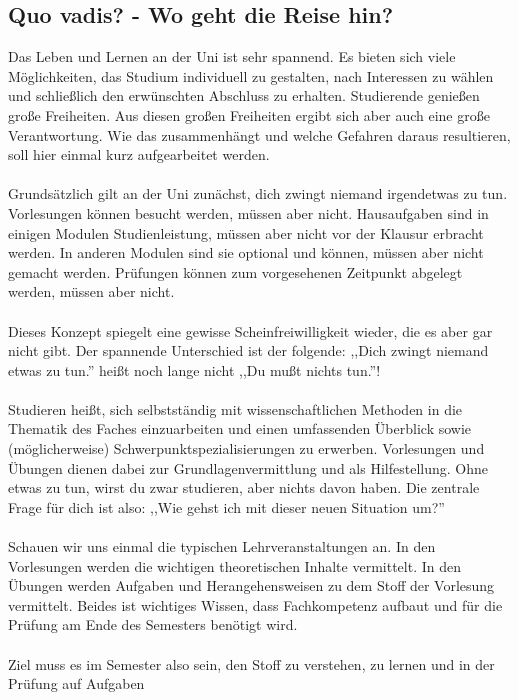 \subsection{Quo vadis? - Wo geht die Reise hin?}
        Das Leben und Lernen an der Uni ist sehr spannend. Es bieten
	sich viele Möglichkeiten, das Studium individuell zu gestalten,
	nach Interessen zu wählen und schließlich den erwünschten
	Abschluss zu erhalten. Studierende genießen große Freiheiten. Aus diesen großen Freiheiten ergibt sich aber auch
	eine große Verantwortung. Wie das zusammenhängt und welche
	Gefahren daraus resultieren, soll hier einmal kurz aufgearbeitet
	werden. \\ \\
        Grundsätzlich gilt an der Uni zunächst, dich zwingt niemand irgendetwas zu tun. Vorlesungen können besucht werden, müssen aber nicht.
Hausaufgaben sind in einigen Modulen Studienleistung, müssen aber nicht vor der Klausur erbracht werden. In anderen Modulen sind sie optional und können, müssen aber nicht gemacht werden. 
Prüfungen können zum vorgesehenen Zeitpunkt abgelegt werden, müssen aber
nicht. \\\\
        Dieses Konzept spiegelt eine gewisse Scheinfreiwilligkeit
	wieder, die es aber gar nicht gibt. Der spannende Unterschied ist
	der folgende: ,,Dich zwingt niemand etwas zu tun.'' heißt noch
	lange nicht ,,Du mußt nichts tun.''! \\\\
Studieren heißt, sich selbstständig mit wissenschaftlichen Methoden in
die Thematik des Faches einzuarbeiten und einen umfassenden Überblick
sowie (möglicherweise) Schwerpunktspezialisierungen zu erwerben.
Vorlesungen und Übungen dienen dabei zur Grundlagenvermittlung und als
Hilfestellung. Ohne etwas zu tun, wirst du zwar studieren, aber nichts
davon haben. Die zentrale Frage für dich ist also: ,,Wie gehst ich  mit
dieser neuen Situation um?''\\\\
 Schauen wir uns einmal die typischen Lehrveranstaltungen an. 
 In den Vorlesungen werden die wichtigen theoretischen Inhalte vermittelt. 
 In den Übungen werden Aufgaben und Herangehensweisen zu dem Stoff der Vorlesung vermittelt. 
 Beides ist wichtiges Wissen, dass Fachkompetenz aufbaut und für die
 Prüfung am Ende des Semesters benötigt wird.\\\\
Ziel muss es im Semester also sein, den Stoff zu verstehen, zu lernen und in der Prüfung auf Aufgaben 
